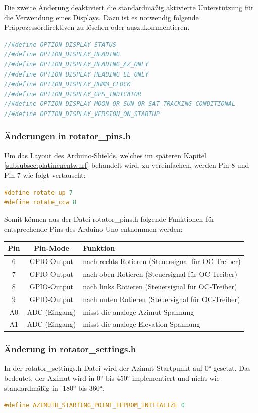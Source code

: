Die zweite Änderung deaktiviert die standardmäßig aktivierte Unterstützung für die Verwendung eines Displays. Dazu ist es notwendig folgende Präprozessordirektiven zu löschen oder auszukommentieren.
\begin{lstlisting}[language=C++]
//#define OPTION_DISPLAY_STATUS
//#define OPTION_DISPLAY_HEADING
//#define OPTION_DISPLAY_HEADING_AZ_ONLY
//#define OPTION_DISPLAY_HEADING_EL_ONLY
//#define OPTION_DISPLAY_HHMM_CLOCK
//#define OPTION_DISPLAY_GPS_INDICATOR 
//#define OPTION_DISPLAY_MOON_OR_SUN_OR_SAT_TRACKING_CONDITIONAL
//#define OPTION_DISPLAY_VERSION_ON_STARTUP
\end{lstlisting}

\subsubsection{Änderungen in rotator\_pins.h}
Um das Layout des Arduino-Shields, welches im späteren Kapitel \ref{subsubsec:platinenentwurf} behandelt wird, zu vereinfachen, werden Pin 8 und Pin 7 wie folgt vertauscht:
\begin{lstlisting}[language=C++]
#define rotate_up 7
#define rotate_ccw 8
\end{lstlisting}

Somit können aus der Datei rotator\_pins.h folgende Funktionen für entsprechende Pins des Arduino Uno entnommen werden:

\begin{table}[H]
	\centering
	\begin{tabular}{| c | c | l |}
		\hline
		\textbf{Pin} & \textbf{Pin-Mode} & \textbf{Funktion} \\
		\hline
		6 & GPIO-Output & nach rechts Rotieren (Steuersignal für OC-Treiber) \\
		\hline
		7 & GPIO-Output & nach oben Rotieren (Steuersignal für OC-Treiber) \\
		\hline
		8 & GPIO-Output & nach links Rotieren (Steuersignal für OC-Treiber) \\
		\hline
		9 & GPIO-Output & nach unten Rotieren (Steuersignal für OC-Treiber) \\
		\hline
		A0 & ADC (Eingang) & misst die analoge Azimut-Spannung \\
		\hline
		A1 & ADC (Eingang) & misst die analoge Elevation-Spannung \\
		\hline
	\end{tabular}
\end{table}
	
\subsubsection{Änderung in rotator\_settings.h}
In der rotator\_settings.h Datei wird der Azimut Startpunkt auf 0° gesetzt. Das bedeutet, der Azimut wird in 0° bis 450° implementiert und nicht wie standardmäßig in -180° bis 360°.
\begin{lstlisting}[language=C++]
#define AZIMUTH_STARTING_POINT_EEPROM_INITIALIZE 0
\end{lstlisting}

